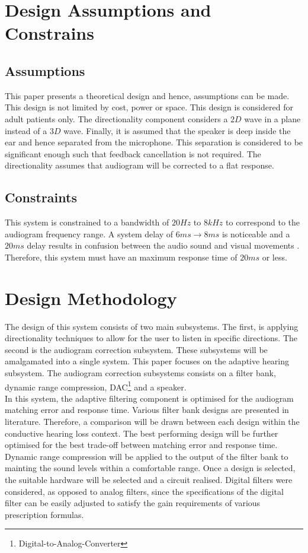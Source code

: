 \documentclass[11pt,onecolumn]{witseiepaper}
\begin{document}
\section{Design Assumptions and Constrains}
\label{sec:assCons}

\subsection{Assumptions}

\noindent This paper presents a theoretical design and hence, assumptions can be made. This design is not limited by cost, power or space. This design is considered for adult patients only. The directionality component considers a $2D$ wave in a plane instead of a $3D$ wave. Finally, it is assumed that the speaker is deep inside the ear and hence separated from the microphone. This separation is considered to be significant enough such that feedback cancellation is not required. The directionality assumes that audiogram will be corrected to a flat response.

\subsection{Constraints}

\noindent This system is constrained to a bandwidth of $20Hz$ to $8kHz$ to correspond to the audiogram frequency range. A system delay of $6ms \rightarrow 8ms$ is noticeable and a $20ms$ delay results in confusion between the audio sound and visual movements \cite{brennan}. Therefore, this system must have an maximum response time of $20ms$ or less. 

\section{Design Methodology}

\noindent The design of this system consists of two main subsystems. The first, is applying directionality techniques to allow for the user to listen in specific directions. The second is the audiogram correction subsystem. These subsystems will be amalgamated into a single system. This paper focuses on the adaptive hearing subsystem. The audiogram correction subsystems consists on a filter bank, dynamic range compression, DAC\footnote{Digital-to-Analog-Converter} and a speaker. \\
\newline
\noindent In this system, the adaptive filtering component is optimised for the audiogram matching error and response time. Various filter bank designs are presented in literature. Therefore, a comparison will be drawn between each design within the conductive hearing loss context. The best performing design will be further optimised for the best trade-off between matching error and response time. Dynamic range compression will be applied to the output of the filter bank to mainting the sound levels within a comfortable range. Once a design is selected, the suitable hardware will be selected and a circuit realised. Digital filters were considered, as opposed to analog filters, since the specifications of the digital filter can be easily adjusted to satisfy the gain requirements of various prescription formulas.
\end{document}
